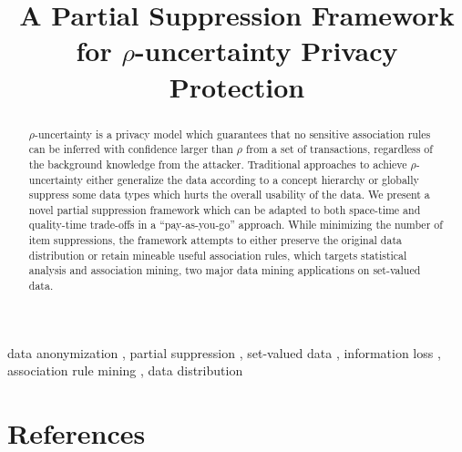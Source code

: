 \documentclass[review]{elsarticle}
\begin{document}
\begin{frontmatter}

\title{A Partial Suppression Framework for $\rho$-uncertainty Privacy
Protection}


%
%
%



\begin{abstract}
$\rho$-uncertainty is a privacy model which guarantees that
no sensitive association rules can be inferred with confidence
larger than $\rho$ from a set of transactions, regardless of
the background knowledge from the attacker.
Traditional approaches to achieve $\rho$-uncertainty either
generalize the data according to a concept hierarchy or globally
suppress some data types which hurts the overall usability of the 
data. We present a novel partial suppression framework
which can be adapted to both space-time and quality-time 
trade-offs in a ``pay-as-you-go'' approach.
While minimizing the number of item suppressions, the framework attempts to
either preserve the original data distribution or retain mineable useful
association rules,
which targets statistical analysis and association mining,
two major data mining applications on set-valued data.
\end{abstract}

\begin{keyword}
data anonymization \sep
partial suppression \sep
set-valued data \sep
information loss \sep
association rule mining \sep
data distribution
\end{keyword}

\end{frontmatter}

\linenumbers








\section*{References}


\end{document}
